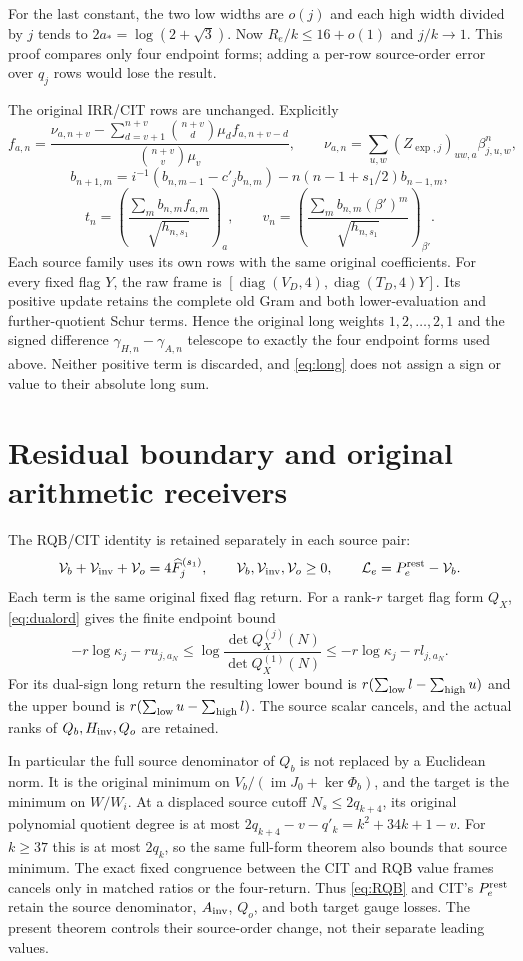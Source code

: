 \documentclass[11pt,a4paper]{article}
\DeclareMathOperator{\im}{im}
\begin{document}
For the last constant, the two low widths are $o(j)$ and each high width divided by $j$ tends to $2a_*=\log(2+\sqrt3)$. Now $R_e/k\le16+o(1)$ and $j/k\to1$. This proof compares only four endpoint forms; adding a per-row source-order error over $q_j$ rows would lose the result.

The original IRR/CIT rows are unchanged. Explicitly
\[
 f_{a,n}=\frac{\nu_{a,n+v}-\sum_{d=v+1}^{n+v}\binom{n+v}{d}\mu_df_{a,n+v-d}}
                  {\binom{n+v}{v}\mu_v},
 \qquad \nu_{a,n}=\sum_{u,w}(Z_{\exp,j})_{uw,a}\beta_{j,u,w}^{n},
\]
\[
 b_{n+1,m}=i^{-1}(b_{n,m-1}-c'_jb_{n,m})
              -n(n-1+s_1/2)b_{n-1,m},
\]
\[
 t_n=\left(\frac{\sum_m b_{n,m}f_{a,m}}{\sqrt{h_{n,s_1}}}\right)_a,
 \qquad v_n=\left(\frac{\sum_m b_{n,m}(\beta')^m}{\sqrt{h_{n,s_1}}}\right)_{\beta'}.
\]
Each source family uses its own rows with the same original coefficients. For every fixed flag $Y$, the raw frame is $[\operatorname{diag}(V_D,4),\operatorname{diag}(T_D,4)Y]$. Its positive update retains the complete old Gram and both lower-evaluation and further-quotient Schur terms. Hence the original long weights $1,2,\ldots,2,1$ and the signed difference $\gamma_{H,n}-\gamma_{A,n}$ telescope to exactly the four endpoint forms used above. Neither positive term is discarded, and \eqref{eq:long} does not assign a sign or value to their absolute long sum.

\section{Residual boundary and original arithmetic receivers}
The RQB/CIT identity is retained separately in each source pair:
\begin{equation}
 \mathcal V_b+\mathcal V_{\rm inv}+\mathcal V_o
       =4\widehat F_j^{(s_1)},\qquad
 \mathcal V_b,\mathcal V_{\rm inv},\mathcal V_o\ge0,
 \qquad \mathcal L_e=P_e^{\rm rest}-\mathcal V_b.
 \label{eq:RQB}
\end{equation}
Each term is the same original fixed flag return. For a rank-$r$ target flag form $Q_X$, \eqref{eq:dualord} gives the finite endpoint bound
\[
 -r\log\kappa_j-r u_{j,a_N}
 \le \log\frac{\det Q_X^{(j)}(N)}{\det Q_X^{(1)}(N)}
 \le-r\log\kappa_j-r l_{j,a_N}.
\]
For its dual-sign long return the resulting lower bound is $r(\sum_{\rm low}l-\sum_{\rm high}u)$ and the upper bound is $r(\sum_{\rm low}u-\sum_{\rm high}l)$. The source scalar cancels, and the actual ranks of $Q_b,H_{\rm inv},Q_o$ are retained.

In particular the full source denominator of $Q_b$ is not replaced by a Euclidean norm. It is the original minimum on $V_b/(\im J_0+\ker\Phi_b)$, and the target is the minimum on $W/W_i$. At a displaced source cutoff $N_s\le2q_{k+4}$, its original polynomial quotient degree is at most $2q_{k+4}-v-q'_k=k^2+34k+1-v$. For $k\ge37$ this is at most $2q_k$, so the same full-form theorem also bounds that source minimum. The exact fixed congruence between the CIT and RQB value frames cancels only in matched ratios or the four-return. Thus \eqref{eq:RQB} and CIT's $P_e^{\rm rest}$ retain the source denominator, $A_{\rm inv}$, $Q_o$, and both target gauge losses. The present theorem controls their source-order change, not their separate leading values.
\end{document}
